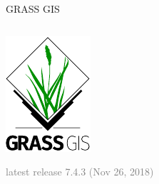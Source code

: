 \documentclass[xcolor={dvipsnames,usenames},beamer,aspectratio=169]{beamer}
\begin{document}
\begin{frame}{GRASS GIS}
\begin{columns}
\begin{column}{0.3\textwidth}
\begin{center}
  \includegraphics[width=\textwidth]{logos/grass_gis}
\end{center}

\vspace*{-1ex}

\textcolor{gray}{
\footnotesize
latest release 7.4.3
\scriptsize
(Nov 26, 2018)
}

\end{column}
\end{columns}

\end{frame}
\end{document}
